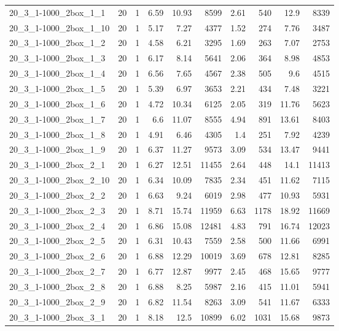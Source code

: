 \begin{center}
\begin{scriptsize}
\begin{longtable}{lrrrrrrrrr}
20\_3\_1-1000\_2box\_1\_1 & 20 & 1 & 6.59 & 10.93 & 8599 & 2.61 & 540 & 12.9 & 8339\\
20\_3\_1-1000\_2box\_1\_10 & 20 & 1 & 5.17 & 7.27 & 4377 & 1.52 & 274 & 7.76 & 3487\\
20\_3\_1-1000\_2box\_1\_2 & 20 & 1 & 4.58 & 6.21 & 3295 & 1.69 & 263 & 7.07 & 2753\\
20\_3\_1-1000\_2box\_1\_3 & 20 & 1 & 6.17 & 8.14 & 5641 & 2.06 & 364 & 8.98 & 4853\\
20\_3\_1-1000\_2box\_1\_4 & 20 & 1 & 6.56 & 7.65 & 4567 & 2.38 & 505 & 9.6 & 4515\\
20\_3\_1-1000\_2box\_1\_5 & 20 & 1 & 5.39 & 6.97 & 3653 & 2.21 & 434 & 7.48 & 3221\\
20\_3\_1-1000\_2box\_1\_6 & 20 & 1 & 4.72 & 10.34 & 6125 & 2.05 & 319 & 11.76 & 5623\\
20\_3\_1-1000\_2box\_1\_7 & 20 & 1 & 6.6 & 11.07 & 8555 & 4.94 & 891 & 13.61 & 8403\\
20\_3\_1-1000\_2box\_1\_8 & 20 & 1 & 4.91 & 6.46 & 4305 & 1.4 & 251 & 7.92 & 4239\\
20\_3\_1-1000\_2box\_1\_9 & 20 & 1 & 6.37 & 11.27 & 9573 & 3.09 & 534 & 13.47 & 9441\\
20\_3\_1-1000\_2box\_2\_1 & 20 & 1 & 6.27 & 12.51 & 11455 & 2.64 & 448 & 14.1 & 11413\\
20\_3\_1-1000\_2box\_2\_10 & 20 & 1 & 6.34 & 10.09 & 7835 & 2.34 & 451 & 11.62 & 7115\\
20\_3\_1-1000\_2box\_2\_2 & 20 & 1 & 6.63 & 9.24 & 6019 & 2.98 & 477 & 10.93 & 5931\\
20\_3\_1-1000\_2box\_2\_3 & 20 & 1 & 8.71 & 15.74 & 11959 & 6.63 & 1178 & 18.92 & 11669\\
20\_3\_1-1000\_2box\_2\_4 & 20 & 1 & 6.86 & 15.08 & 12481 & 4.83 & 791 & 16.74 & 12023\\
20\_3\_1-1000\_2box\_2\_5 & 20 & 1 & 6.31 & 10.43 & 7559 & 2.58 & 500 & 11.66 & 6991\\
20\_3\_1-1000\_2box\_2\_6 & 20 & 1 & 6.88 & 12.29 & 10019 & 3.69 & 678 & 12.81 & 8285\\
20\_3\_1-1000\_2box\_2\_7 & 20 & 1 & 6.77 & 12.87 & 9977 & 2.45 & 468 & 15.65 & 9777\\
20\_3\_1-1000\_2box\_2\_8 & 20 & 1 & 6.88 & 8.25 & 5987 & 2.16 & 415 & 11.01 & 5941\\
20\_3\_1-1000\_2box\_2\_9 & 20 & 1 & 6.82 & 11.54 & 8263 & 3.09 & 541 & 11.67 & 6333\\
20\_3\_1-1000\_2box\_3\_1 & 20 & 1 & 8.18 & 12.5 & 10899 & 6.02 & 1031 & 15.68 & 9873\\

\end{longtable}
\end{scriptsize}
\end{center}

